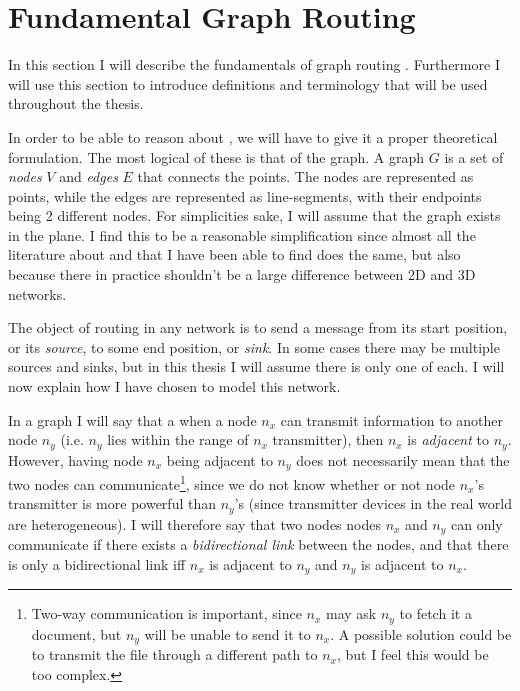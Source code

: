\section{Fundamental Graph Routing}
\label{fundamental}
In this section I will describe the fundamentals of graph routing   . Furthermore I will use this section to introduce definitions and terminology that will be used throughout the thesis.

In order to be able to reason about \manet, we will have to give it a proper theoretical formulation. The most logical of these is that of the graph. A graph $G$ is a set of \emph{nodes} $V$ and \emph{edges} $E$ that connects the points. The nodes are represented as points, while the edges are represented as line-segments, with their endpoints being 2 different nodes. For simplicities sake, I will assume that the graph exists in the plane. I find this to be a reasonable simplification since almost all the literature about \manet and \anet that I have been able to find does the same, but also because there in practice shouldn't be a large difference between 2D and 3D networks. 

The object of routing in any network is to send a message from its start position, or its \emph{source}, to some end position, or \emph{sink}. In some cases there may be multiple sources and sinks, but in this thesis I will assume there is only one of each. I will now explain how I have chosen to model this network. 

In a graph I will say that a when a node $n_x$ can transmit information to another node $n_y$ (i.e. $n_y$ lies within the range of $n_x$ transmitter), then $n_x$ is \emph{adjacent} to $n_y$. However, having node $n_x$ being adjacent to $n_y$ does not necessarily mean that the two nodes can communicate\footnote{Two-way communication is important, since $n_x$ may ask $n_y$ to fetch it a document, but $n_y$ will be unable to send it to $n_x$. A possible solution could be to transmit the file through a different path to $n_x$, but I feel this would be too complex.}, since we do not know whether or not node $n_x$'s transmitter is more powerful than $n_y$'s (since transmitter devices in the real world are heterogeneous). I will therefore say that two nodes nodes $n_x$ and $n_y$ can only communicate if there exists a \emph{bidirectional link} between the nodes, and that there is only a bidirectional link iff $n_x$ is adjacent to $n_y$ and $n_y$ is adjacent to $n_x$.


